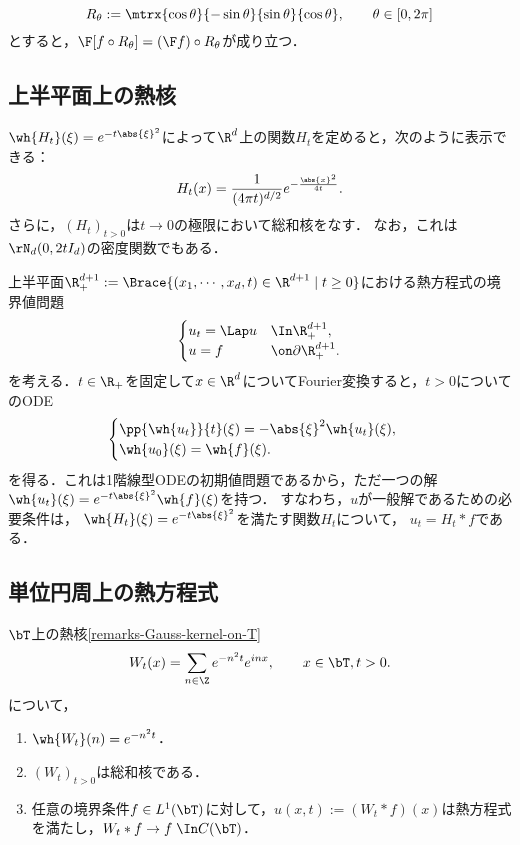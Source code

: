 \documentclass[uplatex,dvipdfmx]{jsreport}
\begin{document}
\begin{proposition}[動径の関数のFourier変換は動径の関数である]
    \[R_\theta:=\mtrx{\cos\theta}{-\sin\theta}{\sin\theta}{\cos\theta},\qquad\theta\in[0,2\pi]\]
    とすると，$\F[f\circ R_\theta]=(\F f)\circ R_\theta$が成り立つ．
\end{proposition}

\subsection{上半平面上の熱核}

\begin{theorem}
    $\wh{H_t}(\xi)=e^{-t\abs{\xi}^2}$によって$\R^d$上の関数$H_t$を定めると，次のように表示できる：
    \[H_t(x)=\frac{1}{(4\pi t)^{d/2}}e^{-\frac{\abs{x}^2}{4t}}.\]
    さらに，$(H_t)_{t>0}$は$t\to0$の極限において総和核をなす．
    なお，これは$\rN_d(0,2tI_d)$の密度関数でもある．
\end{theorem}

\begin{observation}
    上半平面$\R^{d+1}_+:=\Brace{(x_1,\cdots,x_d,t)\in\R^{d+1}\mid t\ge0}$における熱方程式の境界値問題
    \[\begin{cases}
        u_t=\Lap u&\In \R^{d+1}_+,\\
        u=f&\on\partial\R^{d+1}_+.
    \end{cases}\]
    を考える．$t\in\R_+$を固定して$x\in\R^d$についてFourier変換すると，$t>0$についてのODE
    \[\begin{cases}
        \pp{\wh{u_t}}{t}(\xi)=-\abs{\xi}^2\wh{u_t}(\xi),\\
        \wh{u_0}(\xi)=\wh{f}(\xi).
    \end{cases}\]
    を得る．これは1階線型ODEの初期値問題であるから，ただ一つの解$\wh{u_t}(\xi)=e^{-t\abs{\xi}^2}\wh{f}(\xi)$を持つ．
    すなわち，$u$が一般解であるための必要条件は，
    $\wh{H_t}(\xi)=e^{-t\abs{\xi}^2}$を満たす関数$H_t$について，
    $u_t=H_t*f$である．
\end{observation}

\subsection{単位円周上の熱方程式}

\begin{proposition}
    $\bT$上の熱核\ref{remarks-Gauss-kernel-on-T}
    \[W_t(x)=\sum_{n\in\Z}e^{-n^2t}e^{inx},\qquad x\in\bT,t>0.\]
    について，
    \begin{enumerate}
        \item $\wh{W_t}(n)=e^{-n^2t}$．
        \item $(W_t)_{t>0}$は総和核である．
        \item 任意の境界条件$f\in L^1(\bT)$に対して，$u(x,t):=(W_t*f)(x)$は熱方程式を満たし，$W_t*f\to f\;\In C(\bT)$．
    \end{enumerate}
\end{proposition}
\end{document}
